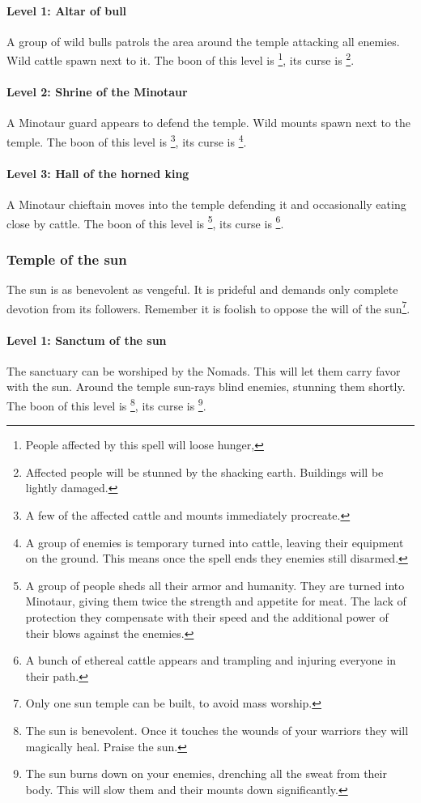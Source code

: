 \paragraph{Level 1: Altar of bull}
A group of wild bulls patrols the area around the temple attacking all enemies.
Wild cattle spawn next to it. The boon of this level is \footnote{ People affected by this spell will loose hunger, }, its
curse is \footnote{ Affected people will be stunned by the
	shacking earth. Buildings will be lightly damaged. }.

\paragraph{Level 2: Shrine of the Minotaur}
A Minotaur guard appears to defend the temple. Wild mounts spawn next to the
temple. The boon of this level is \footnote{ A few of the
	affected cattle and mounts immediately procreate. }, its curse is
\footnote{ A group of enemies is temporary turned
	into cattle, leaving their equipment on the ground. This means once the spell
	ends they enemies still disarmed. }.

\paragraph{Level 3: Hall of the horned king}
A Minotaur chieftain moves into the temple defending it and occasionally eating
close by cattle. The boon of this level is \footnote{ A group of people sheds all their armor and humanity. They are
	turned into Minotaur, giving them twice the strength and appetite for meat. The
	lack of protection they compensate with their speed and the additional power of
	their blows against the enemies. }, its curse is \footnote{ A bunch of ethereal cattle appears and trampling and injuring
	everyone in their path. }.

\subsubsection{Temple of the sun}
The sun is as benevolent as vengeful. It is prideful and demands only complete
devotion from its followers. Remember it is foolish to oppose the will of the
sun\footnote{ Only one sun temple can be built, to avoid mass worship. }.

\paragraph{Level 1: Sanctum of the sun}
The sanctuary can be worshiped by the \gls{Nomads}. This will let them carry
favor with the sun. Around the temple sun-rays blind enemies, stunning them
shortly. The boon of this level is \footnote{ The sun is
	benevolent. Once it touches the wounds of your warriors they will magically
	heal. Praise the sun. }, its curse is \footnote{ The
	sun burns down on your enemies, drenching all the sweat from their body. This
	will slow them and their mounts down significantly. }.

